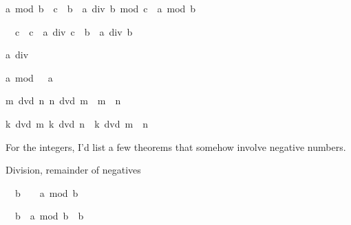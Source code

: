 \begin{isabellebody}
\begin{isamarkuptext}
\begin{isabelle}%
a\ mod\ {\isacharparenleft}b\ {\isacharasterisk}\ c{\isacharparenright}\ {\isacharequal}\ b\ {\isacharasterisk}\ {\isacharparenleft}a\ div\ b\ mod\ c{\isacharparenright}\ {\isacharplus}\ a\ mod\ b%
\end{isabelle}

\begin{isabelle}%
{}\ {\isacharless}\ c\ {\isasymLongrightarrow}\ c\ {\isacharasterisk}\ a\ div\ {\isacharparenleft}c\ {\isacharasterisk}\ b{\isacharparenright}\ {\isacharequal}\ a\ div\ b%
\end{isabelle}

\begin{isabelle}%
a\ div\ {}\ {\isacharequal}\ {}%
\end{isabelle}

\begin{isabelle}%
a\ mod\ {}\ {\isacharequal}\ a%
\end{isabelle}

\begin{isabelle}%
{\isasymlbrakk}m\ dvd\ n{\isacharsemicolon}\ n\ dvd\ m{\isasymrbrakk}\ {\isasymLongrightarrow}\ m\ {\isacharequal}\ n%
\end{isabelle}

\begin{isabelle}%
{\isasymlbrakk}k\ dvd\ m{\isacharsemicolon}\ k\ dvd\ n{\isasymrbrakk}\ {\isasymLongrightarrow}\ k\ dvd\ m\ {\isacharplus}\ n%
\end{isabelle}

For the integers, I'd list a few theorems that somehow involve negative 
numbers.%
\end{isamarkuptext}%
\isamarkuptrue%
%
\begin{isamarkuptext}%
Division, remainder of negatives


\begin{isabelle}%
{}\ {\isacharless}\ b\ {\isasymLongrightarrow}\ {}\ {\isasymle}\ a\ mod\ b%
\end{isabelle}

\begin{isabelle}%
{}\ {\isacharless}\ b\ {\isasymLongrightarrow}\ a\ mod\ b\ {\isacharless}\ b%
\end{isabelle}


\end{isamarkuptext}
\end{isabellebody}
